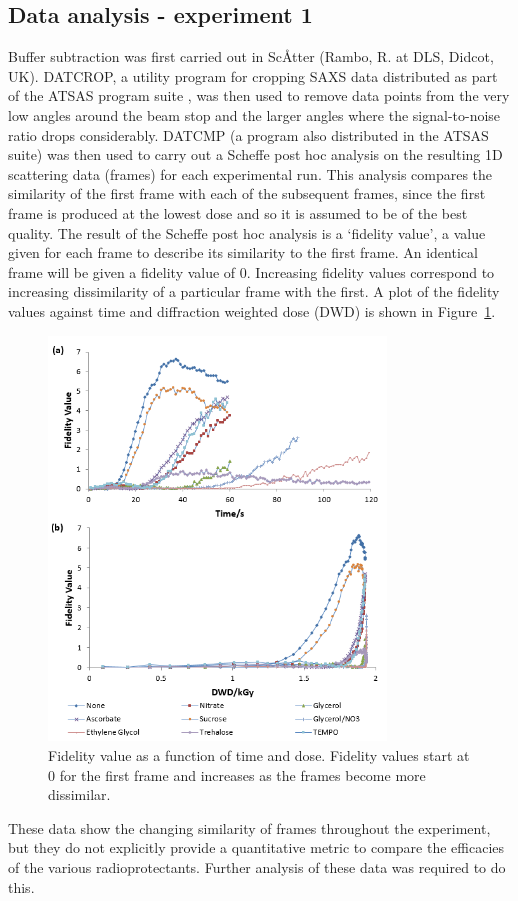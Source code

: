 \subsection{Data analysis - experiment 1}
\label{sub:Data analysis - experiment 1}
Buffer subtraction was first carried out in Sc\AA tter (Rambo, R. at DLS, Didcot, UK).
DATCROP, a utility program for cropping SAXS data distributed as part of the ATSAS program suite \cite{petoukhov2012new}, was then used to remove data points from the very low angles around the beam stop and the larger angles where the signal-to-noise ratio drops considerably.
DATCMP (a program also distributed in the ATSAS suite) was then used to carry out a Scheffe post hoc analysis on the resulting 1D scattering data (frames) for each experimental run.
This analysis compares the similarity of the first frame with each of the subsequent frames, since the first frame is produced at the lowest dose and so it is assumed to be of the best quality.
The result of the Scheffe post hoc analysis is a ‘fidelity value’, a value given for each frame to describe its similarity to the first frame.
An identical frame will be given a fidelity value of 0.
Increasing fidelity values correspond to increasing dissimilarity of a particular frame with the first.
A plot of the fidelity values against time and diffraction weighted dose (DWD) is shown in Figure~\ref{fig:Rebecca data}.
\begin{figure}
    \centering
    \includegraphics[width=0.8\textwidth]{figures/saxs/rebecca_data.png}
    \caption{Fidelity value as a function of time and dose. Fidelity values start at 0 for the first frame and increases as the frames become more dissimilar.}
    \label{fig:Rebecca data}
\end{figure}
These data show the changing similarity of frames throughout the experiment, but they do not explicitly provide a quantitative metric to compare the efficacies of the various radioprotectants.
Further analysis of these data was required to do this.

